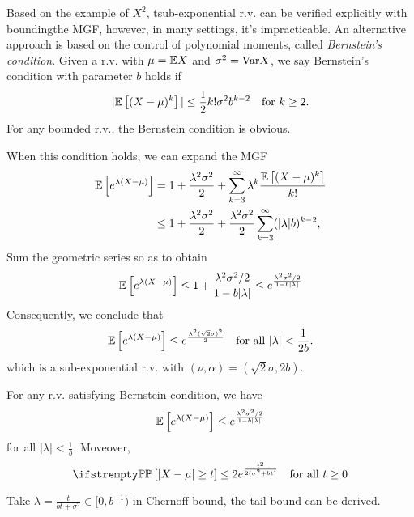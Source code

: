 \documentclass{paper}
\begin{document}
Based on the example of $X^2$, tsub-exponential r.v. can be verified explicitly with boundingthe MGF, however, in many settings, it's impracticable.
An alternative approach is based on the control of polynomial moments, called \textit{Bernstein's condition}. Given a r.v. with $\mu=\mathbb{E} X$ and $\sigma^2=\text{Var}{X}$, we say Bernstein's condition with parameter $b$ holds if
\[
	\vert\mathbb{E}\left[(X-\mu)^k\right]\vert\leq \frac{1}{2}k!\sigma^2b^{k-2} \quad \text{for } k \geq 2.
\]
For any bounded r.v., the Bernstein condition is obvious.\par
When this condition holds, we can expand the MGF
\begin{align*}
	\mathbb{E}\left[e^{\lambda (X-\mu)}\right] & = 1  +\frac{\lambda^2\sigma^2}{2} + \sum_{k=3}^\infty \lambda^k \frac{\mathbb{E}\left[(X-\mu)^k\right]}{k!}            \\
	                                    & \leq 1+ \frac{\lambda^2\sigma^2}{2} + \frac{\lambda^2\sigma^2}{2}\sum_{k=3}^\infty(\vert \lambda\vert b)^{k-2},
\end{align*}
Sum the geometric series so as to obtain
\[
	\mathbb{E}\left[e^{\lambda (X-\mu)}\right] \leq 1 + \frac{\lambda^2\sigma^2/2}{1-b\vert\lambda\vert} \leq e^{\frac{\lambda^2\sigma^2/2}{1-b\vert\lambda\vert}}
\]
Consequently, we conclude that
\[
	\mathbb{E}\left[e^{\lambda (X-\mu)}\right]\leq e^{\frac{\lambda^2(\sqrt{2}\sigma)^2}{2}} \quad \text{for all } \vert \lambda\vert <\frac{1}{2b}.
\]
which is a sub-exponential r.v. with $(\nu, \alpha) = (\sqrt{2}\sigma, 2b)$.
\begin{prop}
	For any r.v. satisfying Bernstein condition, we have
	\[
		\mathbb{E}\left[e^{\lambda (X-\mu)}\right] \leq e^{\frac{\lambda^2\sigma^2/2}{1-b\vert\lambda\vert}}
	\]
	for all $\vert\lambda\vert < \frac{1}{b}$. Moveover,
	\[
		\PP\left[\vert X-\mu\vert\geq t\right] \leq 2e^{\frac{t^2}{2(\sigma^2+bt)}} \quad \text{for all } t \geq 0
	\]
\end{prop}
Take $\lambda = \frac{t}{bt+\sigma^2}\in [0, b^{-1})$ in Chernoff bound, the tail bound can be derived.
\end{document}
